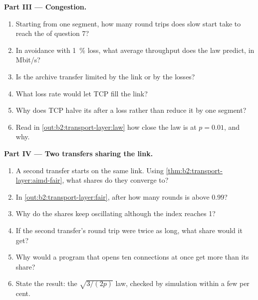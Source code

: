 \begin{problem}
\medskip\noindent\textbf{Part III --- Congestion.}\par\nopagebreak
\begin{enumerate}[resume, beginpenalty=10000]
\item Starting from one segment, how many round trips does slow start take to reach the  of question 7?
\item In  avoidance with 1~\% loss, what average throughput does the law predict, in Mbit/s?
\item Is the archive transfer limited by the link or by the losses?
\item What loss rate would let TCP fill the link?
\item Why does TCP halve its  after a loss rather than reduce it by one segment?
\item Read in \cref{out:b2:transport-layer:law} how close the law is at $p = 0.01$, and why.
\end{enumerate}

\medskip\noindent\textbf{Part IV --- Two transfers sharing the link.}\par\nopagebreak
\begin{enumerate}[resume, beginpenalty=10000]
\item A second transfer starts on the same link. Using \cref{thm:b2:transport-layer:aimd-fair}, what shares do they
converge to?
\item In \cref{out:b2:transport-layer:fair}, after how many rounds is  above 0.99?
\item Why do the shares keep oscillating although the index reaches 1?
\item If the second transfer's round trip were twice as long, what share would it get?
\item Why would a program that opens ten connections at once get more than its share?
\item State the result: the $\sqrt{3/(2p)}$ law, checked by simulation within a few per cent.
\end{enumerate}
\end{problem}
